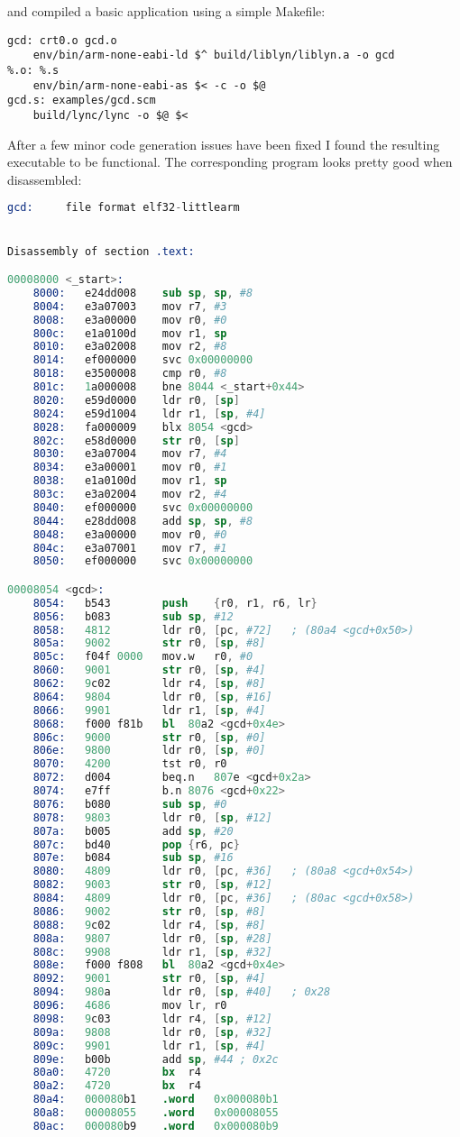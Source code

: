 \documentclass[12pt, article]{article}
\begin{document}
and compiled a basic application using a simple Makefile:
\begin{lstlisting}
gcd: crt0.o gcd.o
	env/bin/arm-none-eabi-ld $^ build/liblyn/liblyn.a -o gcd
%.o: %.s
	env/bin/arm-none-eabi-as $< -c -o $@
gcd.s: examples/gcd.scm
	build/lync/lync -o $@ $<
\end{lstlisting}

After a few minor code generation issues have been fixed I found the
resulting executable to be functional.
The corresponding program looks pretty good when disassembled:

\begin{lstlisting}[language=Assembler, basicstyle=\footnotesize]
gcd:     file format elf32-littlearm


Disassembly of section .text:

00008000 <_start>:
    8000:	e24dd008 	sub	sp, sp, #8
    8004:	e3a07003 	mov	r7, #3
    8008:	e3a00000 	mov	r0, #0
    800c:	e1a0100d 	mov	r1, sp
    8010:	e3a02008 	mov	r2, #8
    8014:	ef000000 	svc	0x00000000
    8018:	e3500008 	cmp	r0, #8
    801c:	1a000008 	bne	8044 <_start+0x44>
    8020:	e59d0000 	ldr	r0, [sp]
    8024:	e59d1004 	ldr	r1, [sp, #4]
    8028:	fa000009 	blx	8054 <gcd>
    802c:	e58d0000 	str	r0, [sp]
    8030:	e3a07004 	mov	r7, #4
    8034:	e3a00001 	mov	r0, #1
    8038:	e1a0100d 	mov	r1, sp
    803c:	e3a02004 	mov	r2, #4
    8040:	ef000000 	svc	0x00000000
    8044:	e28dd008 	add	sp, sp, #8
    8048:	e3a00000 	mov	r0, #0
    804c:	e3a07001 	mov	r7, #1
    8050:	ef000000 	svc	0x00000000

00008054 <gcd>:
    8054:	b543      	push	{r0, r1, r6, lr}
    8056:	b083      	sub	sp, #12
    8058:	4812      	ldr	r0, [pc, #72]	; (80a4 <gcd+0x50>)
    805a:	9002      	str	r0, [sp, #8]
    805c:	f04f 0000 	mov.w	r0, #0
    8060:	9001      	str	r0, [sp, #4]
    8062:	9c02      	ldr	r4, [sp, #8]
    8064:	9804      	ldr	r0, [sp, #16]
    8066:	9901      	ldr	r1, [sp, #4]
    8068:	f000 f81b 	bl	80a2 <gcd+0x4e>
    806c:	9000      	str	r0, [sp, #0]
    806e:	9800      	ldr	r0, [sp, #0]
    8070:	4200      	tst	r0, r0
    8072:	d004      	beq.n	807e <gcd+0x2a>
    8074:	e7ff      	b.n	8076 <gcd+0x22>
    8076:	b080      	sub	sp, #0
    8078:	9803      	ldr	r0, [sp, #12]
    807a:	b005      	add	sp, #20
    807c:	bd40      	pop	{r6, pc}
    807e:	b084      	sub	sp, #16
    8080:	4809      	ldr	r0, [pc, #36]	; (80a8 <gcd+0x54>)
    8082:	9003      	str	r0, [sp, #12]
    8084:	4809      	ldr	r0, [pc, #36]	; (80ac <gcd+0x58>)
    8086:	9002      	str	r0, [sp, #8]
    8088:	9c02      	ldr	r4, [sp, #8]
    808a:	9807      	ldr	r0, [sp, #28]
    808c:	9908      	ldr	r1, [sp, #32]
    808e:	f000 f808 	bl	80a2 <gcd+0x4e>
    8092:	9001      	str	r0, [sp, #4]
    8094:	980a      	ldr	r0, [sp, #40]	; 0x28
    8096:	4686      	mov	lr, r0
    8098:	9c03      	ldr	r4, [sp, #12]
    809a:	9808      	ldr	r0, [sp, #32]
    809c:	9901      	ldr	r1, [sp, #4]
    809e:	b00b      	add	sp, #44	; 0x2c
    80a0:	4720      	bx	r4
    80a2:	4720      	bx	r4
    80a4:	000080b1 	.word	0x000080b1
    80a8:	00008055 	.word	0x00008055
    80ac:	000080b9 	.word	0x000080b9


\end{lstlisting}
\end{document}
